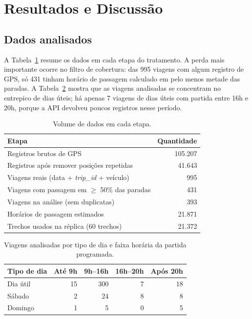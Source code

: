 \section{Resultados e Discussão}
\label{sec:resultados}

\subsection{Dados analisados}

A Tabela~\ref{tab:dados} resume os dados em cada etapa do tratamento. A perda mais
importante ocorre no filtro de cobertura: das 995 viagens com algum registro de GPS, só 431
tinham horário de passagem calculado em pelo menos metade das paradas. A Tabela~\ref{tab:faixas}
mostra que as viagens analisadas se concentram no entrepico de dias úteis; há apenas 7 viagens
de dias úteis com partida entre 16h e 20h, porque a API devolveu poucos registros nesse
período.

\begin{table}[htbp]
\centering
\caption{Volume de dados em cada etapa.}
\label{tab:dados}
\begin{tabular}{lr}
\toprule
Etapa & Quantidade \\
\midrule
Registros brutos de GPS & 105.207 \\
Registros após remover posições repetidas & 41.643 \\
Viagens reais (data + \textit{trip\_id} + veículo) & 995 \\
Viagens com passagem em $\geq$ 50\% das paradas & 431 \\
Viagens na análise (sem duplicatas) & 393 \\
Horários de passagem estimados & 21.871 \\
Trechos usados na réplica (60 trechos) & 21.372 \\
\bottomrule
\end{tabular}
\end{table}

\begin{table}[htbp]
\centering
\caption{Viagens analisadas por tipo de dia e faixa horária da partida programada.}
\label{tab:faixas}
\begin{tabular}{lrrrr}
\toprule
Tipo de dia & Até 9h & 9h--16h & 16h--20h & Após 20h \\
\midrule
Dia útil & 15 & 300 & 7 & 18 \\
Sábado & 2 & 24 & 8 & 8 \\
Domingo & 1 & 5 & 0 & 5 \\
\bottomrule
\end{tabular}
\end{table}


